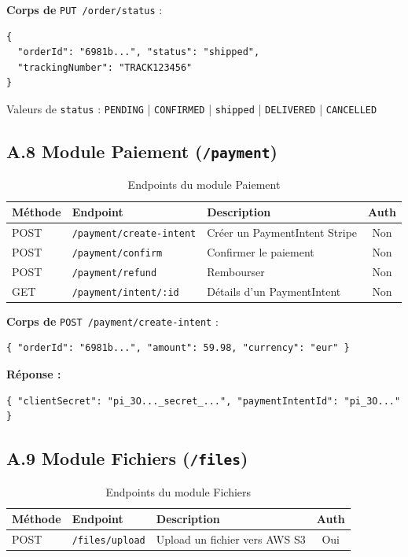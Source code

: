 \textbf{Corps de} \texttt{PUT /order/status} :
\begin{verbatim}
{
  "orderId": "6981b...", "status": "shipped",
  "trackingNumber": "TRACK123456"
}
\end{verbatim}
Valeurs de \texttt{status} : \texttt{PENDING} | \texttt{CONFIRMED} | \texttt{shipped} | \texttt{DELIVERED} | \texttt{CANCELLED}

\subsection*{A.8 Module Paiement (\texttt{/payment})}

\begin{table}[H]
    \centering
    \begin{tabular}{|l|l|p{5.5cm}|c|}
        \hline
        \textbf{Méthode} & \textbf{Endpoint} & \textbf{Description} & \textbf{Auth} \\
        \hline
        POST & \texttt{/payment/create-intent}       & Créer un PaymentIntent Stripe  & Non \\
        POST & \texttt{/payment/confirm}             & Confirmer le paiement          & Non \\
        POST & \texttt{/payment/refund}              & Rembourser                     & Non \\
        GET  & \texttt{/payment/intent/:id}         & Détails d'un PaymentIntent     & Non \\
        \hline
    \end{tabular}
    \caption{Endpoints du module Paiement}
\end{table}

\textbf{Corps de} \texttt{POST /payment/create-intent} :
\begin{verbatim}
{ "orderId": "6981b...", "amount": 59.98, "currency": "eur" }
\end{verbatim}
\textbf{Réponse :}
\begin{verbatim}
{ "clientSecret": "pi_3O..._secret_...", "paymentIntentId": "pi_3O..." }
\end{verbatim}

\subsection*{A.9 Module Fichiers (\texttt{/files})}

\begin{table}[H]
    \centering
    \begin{tabular}{|l|l|p{5.5cm}|c|}
        \hline
        \textbf{Méthode} & \textbf{Endpoint} & \textbf{Description} & \textbf{Auth} \\
        \hline
        POST & \texttt{/files/upload} & Upload un fichier vers AWS S3 & Oui \\
        \hline
    \end{tabular}
    \caption{Endpoints du module Fichiers}
\end{table}

